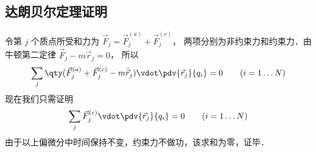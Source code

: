 \subsection{达朗贝尔定理证明}
令第 $j$ 个质点所受和力为 $\vec F_j = \vec F_j^{(a)} + \vec F_j^{(c)}$， 两项分别为非约束力和约束力．由牛顿第二定律 $\vec F_j - m\ddot{\vec r}_j = 0$， 所以
\begin{equation}
\sum_j \qty(\vec F_j^{(a)}+\vec F_j^{(c)} - m\ddot{\vec r}_j) \vdot \pdv{\vec r_j}{q_i} = 0
\qquad (i = 1\dots N)
\end{equation}
现在我们只需证明
\begin{equation}
\sum_j  \vec F_j^{(c)} \vdot \pdv{\vec r_j}{q_i}  = 0
\qquad (i = 1\dots N)
\end{equation}
由于以上偏微分中时间保持不变，约束力不做功，该求和为零，证毕．%


